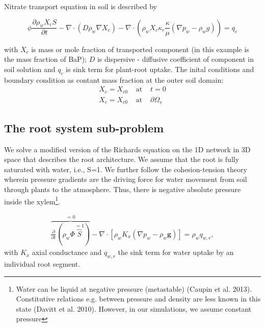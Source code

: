 Nitrate transport  equation in soil is described by

\[
\phi\frac{\partial\rho_{w}X_{c}S}{\partial t}-\nabla \cdot (D\rho_{w}\nabla X_{c})-\nabla \cdot (\rho_{w}X_{c}\kappa_{r}\frac{\kappa}{\mu}(\nabla p_{w}-\rho_{w}g))=q_{c}
\]

with $X_{c}$ is mass or mole fraction of transported component (in
this example is the mass fraction of BaP); $D$ is dispersive - diffusive
coefficient of component in soil solution and $q_{c}$ is sink term
for plant-root uptake. The inital conditions and boundary condition
as contant mass fraction at the outer soil domain:
\begin{eqnarray}
X_{c}=X_{c0} & \text{ at } & t=0\\
X_{c}=X_{c0} & \text{ at } & \partial\Omega_{s}
\end{eqnarray}


\subsection*{The root system sub-problem}

We solve a modified version of the Richards equation on the 1D network
in 3D space that describes the root architecture. We assume that the
root is fully saturated with water, i.e., S=1. We further follow the
cohesion-tension theory wherein pressure gradients are the driving
force for water movement from soil through plants to the atmosphere.
Thus, there is negative absolute pressure inside the xylem\footnote{Water can be liquid at negative pressure (metastable) (Caupin et al.
2013). Constitutive relations e.g. between pressure and density are
less known in this state (Davitt et al. 2010). However, in our simulations,
we assume constant pressure}.

\begin{eqnarray}
\overbrace{\frac{\partial}{\partial t}\left(\rho_{w}\Phi\overbrace{S}^{=1}\right)}^{=0}-\nabla\cdot\left[\rho_{w}K_{x}\left(\nabla p_{w}-\rho_w\boldsymbol{g}\right)\right]=\rho_{w}q_{w,r},
\end{eqnarray}
with $K_{x}$ axial conductance and $q_{w,r}$ the sink term for water
uptake by an individual root segment.

